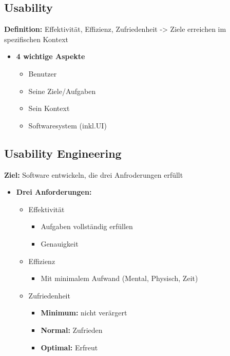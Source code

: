 \documentclass{article}
\begin{document}
\subsection{Usability}
\textbf{Definition: } Effektivität, Effizienz, Zufriedenheit -> Ziele erreichen im spezifischen Kontext \\

\begin{itemize}
	\item \textbf{4 wichtige Aspekte}
	\begin{itemize}
		\item Benutzer
		\item Seine Ziele/Aufgaben
		\item Sein Kontext
		\item Softwaresystem (inkl.UI)
	\end{itemize}
\end{itemize}


\subsection{Usability Engineering}

\textbf{Ziel: } Software entwickeln, die drei Anfroderungen erfüllt

\begin{itemize}
	\item \textbf{Drei Anforderungen: }
	\begin{itemize}
		\item Effektivität
		\begin{itemize}
			\item Aufgaben vollständig erfüllen
			\item Genauigkeit
		\end{itemize}
	
		\item Effizienz
		\begin{itemize}
			\item Mit minimalem Aufwand (Mental, Physisch, Zeit)
		\end{itemize}
					\item Zufriedenheit 
		\begin{itemize}
			\item \textbf{Minimum: } nicht verärgert
			\item \textbf{Normal: } Zufrieden
			\item \textbf{Optimal: } Erfreut
		\end{itemize}

	\end{itemize}

\end{itemize}
\end{document}
